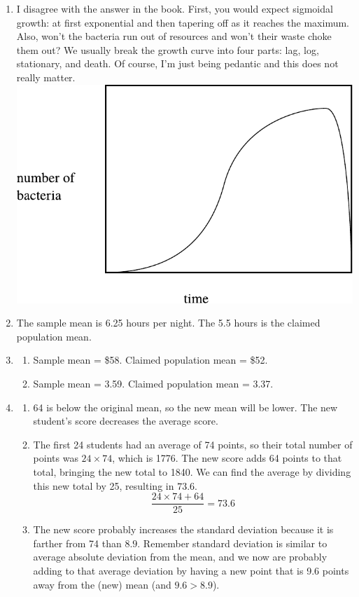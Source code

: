 \documentclass[12pt,letterpaper]{article}
\begin{document}
\begin{enumerate}
\item I disagree with the answer in the book. First, you would expect sigmoidal growth: at first exponential and then tapering off as it reaches the maximum. Also, won't the bacteria run out of resources and won't their waste choke them out? We usually break the growth curve into four parts: lag, log, stationary, and death. Of course, I'm just being pedantic and this does not really matter. \\
\includegraphics[scale=0.5]{figures/bacteria_vs_time.pdf}

\item The sample mean is 6.25 hours per night. The 5.5 hours is the claimed population mean.

\item \begin{enumerate}
\item Sample mean = \$58. Claimed population mean = \$52.
\item Sample mean = 3.59. Claimed population mean = 3.37.
\end{enumerate}

\item \begin{enumerate}
\item 64 is below the original mean, so the new mean will be lower. The new student's score decreases the average score.
\item The first 24 students had an average of 74 points, so their total number of points was $24\times 74$, which is 1776. The new score adds 64 points to that total, bringing the new total to 1840. We can find the average by dividing this new total by 25, resulting in $73.6$. 
$$\frac{24\times 74 + 64}{25} = 73.6 $$
\item The new score probably increases the standard deviation because it is farther from 74 than $8.9$. Remember standard deviation is similar to average absolute deviation from the mean, and we now are probably adding to that average deviation by having a new point that is 9.6 points away from the (new) mean (and $9.6 > 8.9$).
\end{enumerate}


\end{enumerate}
\end{document}
